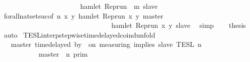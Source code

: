 \begin{isabellebody}
\ \ \ \ \ \ \ \ \ \ \ \ \ \ \ \ \ \ \ \ \ {\isasymlongrightarrow}\ {\isasymnot}\ hamlet\ {\isacharparenleft}{\isacharparenleft}Rep{\isacharunderscore}run\ {\isasymrho}{\isacharparenright}\ m\ slave{\isacharparenright}{\isacharbraceright}{\isacartoucheclose}\isanewline
\ \ \ \ \isamarkupfalse%
\ forall{\isacharunderscore}nat{\isacharunderscore}set{\isacharunderscore}suc{\isacharbrackleft}of\ {\isacartoucheopen}n{\isacartoucheclose}\ {\isacartoucheopen}{\isasymlambda}x\ y{\isachardot}\ hamlet\ {\isacharparenleft}{\isacharparenleft}Rep{\isacharunderscore}run\ x{\isacharparenright}\ y\ master{\isacharparenright}\isanewline
\ \ \ \ \ \ \ \ \ \ \ \ \ \ \ \ \ \ \ \ \ \ \ \ \ \ \ \ \ \ \ {\isasymlongrightarrow}\ {\isasymnot}hamlet\ {\isacharparenleft}{\isacharparenleft}Rep{\isacharunderscore}run\ x{\isacharparenright}\ y\ slave{\isacharparenright}{\isacartoucheclose}{\isacharbrackright}\ \isamarkupfalse%
\ simp\isanewline
\ \ \isamarkupfalse%
\ {\isacharquery}thesis\ \isamarkupfalse%
\ auto\isanewline
{}\isamarkupfalse%
%
\endisatagproof
{\isafoldproof}%
%
\isadelimproof
\isanewline
%
\endisadelimproof
\isanewline
{}\isamarkupfalse%
\ TESL{\isacharunderscore}interp{\isacharunderscore}stepwise{\isacharunderscore}timedelayed{\isacharunderscore}coind{\isacharunderscore}unfold{\isacharcolon}\isanewline
\ \ {\isacartoucheopen}{\isasymlbrakk}\ master\ time{\isacharminus}delayed\ by\ {\isasymdelta}{\isasymtau}\ on\ measuring\ implies\ slave\ {\isasymrbrakk}\isactrlsub T\isactrlsub E\isactrlsub S\isactrlsub L\isactrlbsup {\isasymge}\ n\isactrlesup \ {\isacharequal}\isanewline
\ \ \ \ \ {\isacharparenleft}\ \ \ \ \ {\isasymlbrakk}\ master\ {\isasymnot}{\isasymUp}\ n\ {\isasymrbrakk}\isactrlsub p\isactrlsub r\isactrlsub i\isactrlsub m\ \ \ \ \ \ \ \ \ \ \ \ \ \ \ %
\end{isabellebody}
